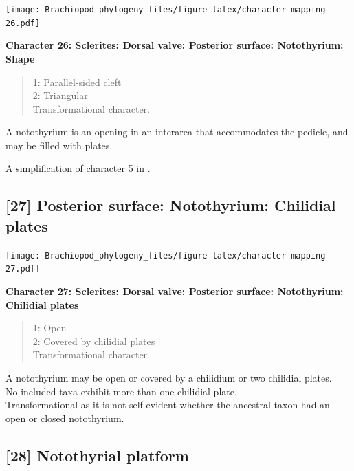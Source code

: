 \documentclass[]{book}
\theoremstyle{definition}
\theoremstyle{definition}
\theoremstyle{definition}
\theoremstyle{remark}
\begin{document}
\texttt{[image: Brachiopod\_phylogeny\_files/figure-latex/character-mapping-26.pdf]}

\textbf{Character 26: Sclerites: Dorsal valve: Posterior surface:
Notothyrium: Shape}

\begin{quote}
1: Parallel-sided cleft\\
2: Triangular\\
Transformational character.
\end{quote}

A notothyrium is an opening in an interarea that accommodates the
pedicle, and may be filled with plates.

A simplification of character 5 in
\citet{Bassett2001Functionalmorphology}.

\hypertarget{posterior-surface-notothyrium-chilidial-plates}{%
\subsection*{{[}27{]} Posterior surface: Notothyrium: Chilidial
plates}\label{posterior-surface-notothyrium-chilidial-plates}}

\texttt{[image: Brachiopod\_phylogeny\_files/figure-latex/character-mapping-27.pdf]}

\textbf{Character 27: Sclerites: Dorsal valve: Posterior surface:
Notothyrium: Chilidial plates}

\begin{quote}
1: Open\\
2: Covered by chilidial plates\\
Transformational character.
\end{quote}

A notothyrium may be open or covered by a chilidium or two chilidial
plates.\\
No included taxa exhibit more than one chilidial plate.\\
Transformational as it is not self-evident whether the ancestral taxon
had an open or closed notothyrium.

\hypertarget{notothyrial-platform}{%
\subsection*{{[}28{]} Notothyrial platform}\label{notothyrial-platform}}
\end{document}
